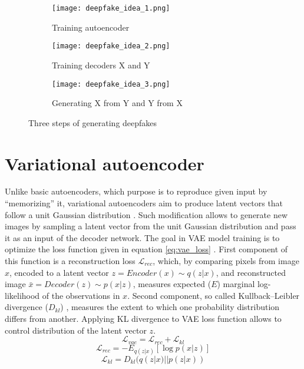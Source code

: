 \begin{figure}[H]
\centering
\begin{subfigure}{12cm}
\texttt{[image: deepfake\_idea\_1.png]}
\caption{Training autoencoder}
\label{subfig:deepfake_steps_a}
\end{subfigure}

\begin{subfigure}{12cm}
\texttt{[image: deepfake\_idea\_2.png]}
\caption{Training decoders X and Y}
\label{subfig:deepfake_steps_b}
\end{subfigure}

\begin{subfigure}{12cm}
\texttt{[image: deepfake\_idea\_3.png]}
\caption{Generating X from Y and Y from X}
\label{subfig:deepfake_steps_c}
\end{subfigure}

\caption{Three steps of generating deepfakes}
\label{fig:deepfake_steps}
\end{figure}

\newpage
\section{Variational autoencoder}
\label{Variational_autoencoder}
Unlike basic autoencoders, which purpose is to reproduce given input by ``memorizing'' it, variational autoencoders aim to produce latent vectors that follow a unit Gaussian distribution \cite{variational_bayes_bib}. Such modification allows to generate new images by sampling a latent vector from the unit Gaussian distribution and pass it as an input of the decoder network. The goal in VAE model training is to optimize the loss function given in equation \ref{eq:vae_loss} \cite{vae_loss_bib}. First component of this function is a reconstruction loss \(\mathcal{L}_{rec}\), which, by comparing pixels from image \(x\), encoded to a latent vector \(z = Encoder(x) \sim q(z|x)\), and reconstructed image \(\bar{x} = Decoder(z) \sim p(x|z)\), measures expected (\(E\)) marginal log-likelihood of the observations in \(x\). Second component, so called Kullback–Leibler divergence (\(D_{kl}\)) \cite{kl_divergence_bib}, measures the extent to which one probability distribution differs from another. Applying KL divergence to VAE loss function allows to control distribution of the latent vector \(z\).
%
\begin{equation}
\label{eq:vae_loss}
\mathcal{L}_{vae} = \mathcal{L}_{rec} + \mathcal{L}_{kl}
\end{equation}
%
\begin{equation}
\label{eq:rec_loss}
\mathcal{L}_{rec} = -E_{q(z|x)}[\log{p(x|z)}]
\end{equation}
%
\begin{equation}
\label{eq:kl_loss}
\mathcal{L}_{kl} = D_{kl}(q(z|x)||p(z|x))
\end{equation}

